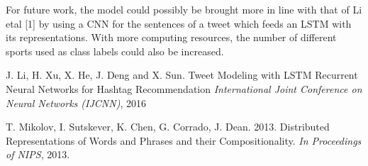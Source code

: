 \documentclass[journal, a4paper]{IEEEtran}
\begin{document}
For future work, the model could possibly be brought more in line with that of Li etal [1] by using a CNN for the sentences of a tweet which feeds an LSTM with its representations. With more computing resources, the number of different sports used as class labels could also be increased.







\begin{thebibliography}{5}

	J. Li, H. Xu, X. He, J. Deng and X. Sun. Tweet Modeling with LSTM Recurrent Neural
	Networks for Hashtag Recommendation {\em International Joint Conference on Neural Networks (IJCNN)}, 2016

	T. Mikolov, I. Sutskever, K. Chen, G. Corrado, J. Dean. 2013. Distributed Representations of Words and Phrases and their Compositionality. {\em In Proceedings of NIPS}, 2013.

\end{thebibliography}

\end{document}
